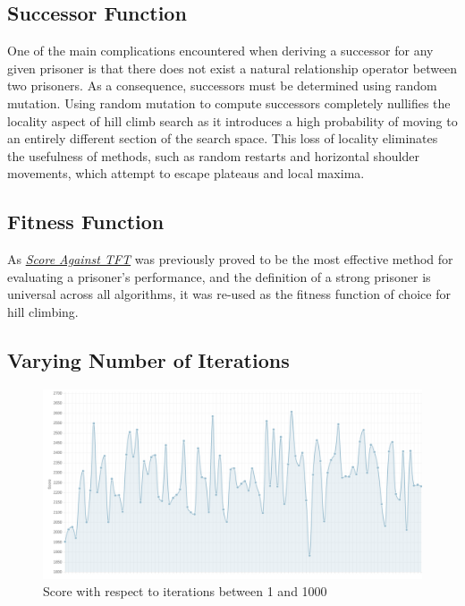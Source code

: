 \documentclass[12pt]{article}
\begin{document}
\subsection {Successor Function}

One of the main complications encountered when deriving a successor for any given prisoner
is that there does not exist a natural relationship operator between two prisoners.
As a consequence, successors must be determined using random mutation.  Using
random mutation to compute successors completely nullifies the locality aspect
of hill climb search as it introduces a high probability of moving to an entirely different
section of the search space.  This loss of locality eliminates the usefulness of
methods, such as random restarts and horizontal shoulder movements, which attempt to
escape plateaus and local maxima.

\subsection {Fitness Function}

As \textit{\hyperref[tft]{Score Against TFT}} was previously proved to be the most
effective method for evaluating a prisoner's performance, and the definition
of a strong prisoner is universal across all algorithms, it was re-used as the fitness
function of choice for hill climbing.

\pagebreak

\subsection{Varying Number of Iterations}
\begin{figure}[h]
    \centering
    \includegraphics[scale=0.4]{figures/hill_climb.png}
    \caption{Score with respect to iterations between 1 and 1000}
\end{figure}
\end{document}
